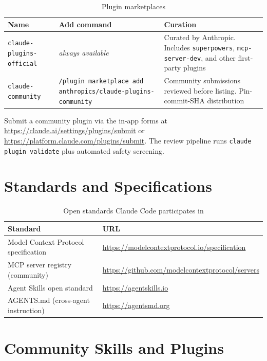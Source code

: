 \begin{table}[ht]
\centering
\caption{Plugin marketplaces}
\label{tab:app-marketplaces}
\begin{tabularx}{\textwidth}{llX}
\toprule
\textbf{Name} & \textbf{Add command} & \textbf{Curation} \\
\midrule
\texttt{claude-plugins-official}
  & \emph{always available}
  & Curated by Anthropic. Includes \texttt{superpowers}, \texttt{mcp-server-dev}, and other first-party plugins \\
\texttt{claude-community}
  & \texttt{/plugin marketplace add anthropics/claude-plugins-community}
  & Community submissions reviewed before listing. Pin-commit-SHA distribution \\
\bottomrule
\end{tabularx}
\end{table}

Submit a community plugin via the in-app forms at
\url{https://claude.ai/settings/plugins/submit} or
\url{https://platform.claude.com/plugins/submit}. The review pipeline runs
\texttt{claude plugin validate} plus automated safety screening.

\section{Standards and Specifications}
\label{app:standards}

\begin{table}[ht]
\centering
\caption{Open standards Claude Code participates in}
\label{tab:app-standards}
\begin{tabularx}{\textwidth}{lX}
\toprule
\textbf{Standard} & \textbf{URL} \\
\midrule
Model Context Protocol specification & \url{https://modelcontextprotocol.io/specification} \\
MCP server registry (community)      & \url{https://github.com/modelcontextprotocol/servers} \\
Agent Skills open standard           & \url{https://agentskills.io} \\
AGENTS.md (cross-agent instruction)  & \url{https://agentsmd.org} \\
\bottomrule
\end{tabularx}
\end{table}

\section{Community Skills and Plugins}
\label{app:community-plugins}

